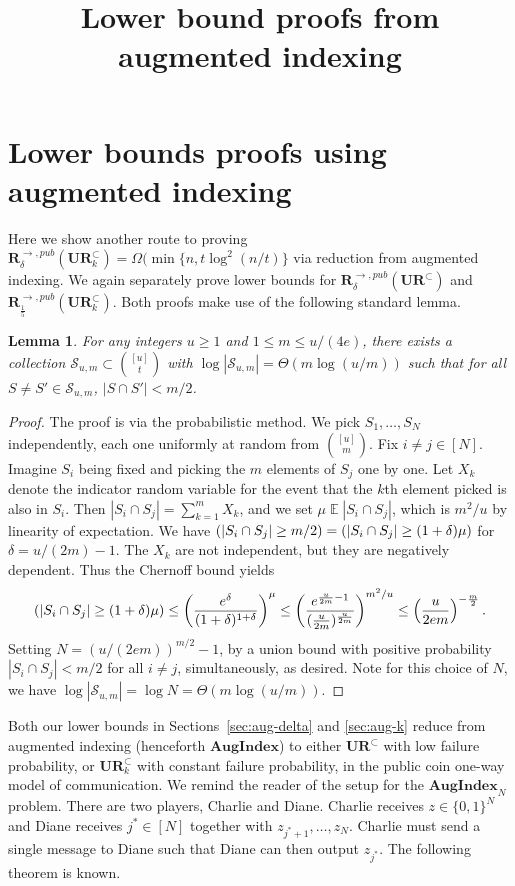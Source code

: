 \documentclass[11pt]{article}
\title{Lower bound proofs from augmented indexing}
\newtheorem{lemma}{Lemma}
\DeclareMathOperator*{\E}{\mathbb{E}}
\let\Pr\relax
\DeclareMathOperator*{\Pr}{\mathbb{P}}
\newcommand{\aug}{\mathbf{AugIndex}\xspace}
\newcommand{\ur}{\mathbf{UR}\xspace}
\newcommand{\randcom}{\mathbf{R}}
\begin{document}
\maketitle

\section{Lower bounds proofs using augmented indexing}

Here we show another route to proving $\randcom^{\rightarrow,pub}_\delta(\ur_k^\subset) = \Omega(\min\{n, t\log^2(n/t)\}$ via reduction from augmented indexing. We again separately prove lower bounds for $\randcom^{\rightarrow,pub}_\delta(\ur^\subset)$ and $\randcom^{\rightarrow,pub}_{\frac 15}(\ur_k^\subset)$. Both proofs make use of the following standard lemma.

\begin{lemma}\label{lem:code}
For any integers $u\ge 1$ and $1\le m\le u/(4e)$, there exists a collection $\mathcal S_{u,m} \subset \binom{[u]}t$ with $\log |\mathcal{S}_{u,m}| = \Theta(m\log(u/m))$ such that for all $S\neq S'\in \mathcal S_{u,m}$, $|S\cap S'| < m/2$.
\end{lemma}
\begin{proof}
The proof is via the probabilistic method. We pick $S_1,\ldots,S_N$ independently, each one uniformly at random from $\binom{[u]}m$. Fix $i\neq j\in[N]$. Imagine $S_i$ being fixed and picking the $m$ elements of $S_j$ one by one. Let $X_k$ denote the indicator random variable for the event that the $k$th element picked is also in $S_i$. Then $|S_i\cap S_j| = \sum_{k=1}^m X_k$, and we set $\mu \E |S_i\cap S_j|$, which is $m^2/u$ by linearity of expectation. We have $\Pr(|S_i \cap S_j| \ge m/2) = \Pr(|S_i\cap S_j| \ge (1+\delta)\mu)$ for $\delta = u/(2m) - 1$. The $X_k$ are not independent, but they are negatively dependent. Thus the Chernoff bound yields
$$
\Pr(|S_i\cap S_j| \ge (1+\delta)\mu) \le \left(\frac{e^{\delta}}{(1+\delta)^{1+\delta}}\right)^\mu \le \left(\frac{e^{\frac u{2m} - 1}}{(\frac u{2m})^{\frac u{2m}}}\right)^{m^2/u} \le \left(\frac u{2em}\right)^{-\frac m2} .
$$
Setting $N = (u/(2em))^{m/2} - 1$, by a union bound with positive probability $|S_i\cap S_j| < m/2$ for all $i\neq j$, simultaneously, as desired. Note for this choice of $N$, we have $\log|\mathcal S_{u,m}| = \log N = \Theta(m\log(u/m))$.
\end{proof}

Both our lower bounds in Sections~\ref{sec:aug-delta} and \ref{sec:aug-k} reduce from augmented indexing (henceforth $\aug$) to either $\ur^\subset$ with low failure probability, or $\ur_k^\subset$ with constant failure probability, in the public coin one-way model of communication. We remind the reader of the setup for the $\aug_N$ problem. There are two players, Charlie and Diane. Charlie receives $z\in\{0,1\}^N$ and Diane receives $j^*\in[N]$ together with $z_{j^*+1},\ldots,z_N$. Charlie must send a single message to Diane such that Diane can then output $z_{j^*}$. The following theorem is known.
\end{document}
